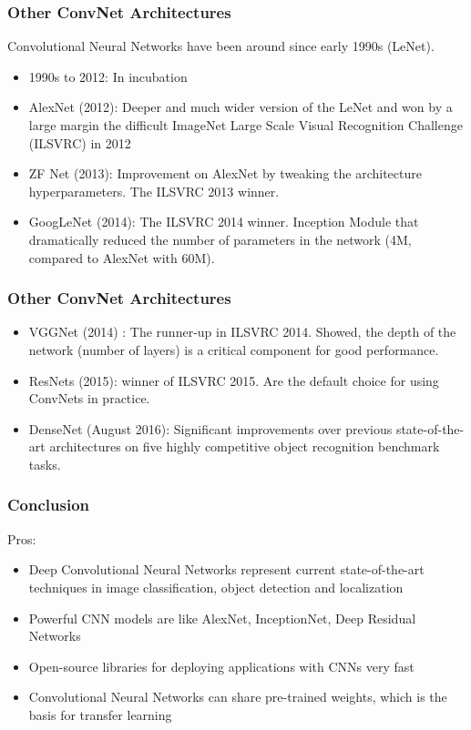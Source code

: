 \begin{frame}[fragile] \frametitle{Other ConvNet Architectures}
Convolutional Neural Networks have been around since early 1990s (LeNet).
\begin{itemize}
\item 1990s to 2012: In incubation
\item AlexNet (2012): Deeper and much wider version of the LeNet and won by a large margin the difficult ImageNet Large Scale Visual Recognition Challenge (ILSVRC) in 2012
\item ZF Net (2013): Improvement on AlexNet by tweaking the architecture hyperparameters. The ILSVRC 2013 winner.
\item GoogLeNet (2014): The ILSVRC 2014 winner. Inception Module that dramatically reduced the number of parameters in the network (4M, compared to AlexNet with 60M).
\end{itemize}
\end{frame}

\begin{frame}[fragile] \frametitle{Other ConvNet Architectures}
\begin{itemize}
\item VGGNet (2014) : The runner-up in ILSVRC 2014. Showed, the depth of the network (number of layers) is a critical component for good performance.
\item ResNets (2015): winner of ILSVRC 2015. Are the default choice for using ConvNets in practice.
\item DenseNet (August 2016): Significant improvements over previous state-of-the-art architectures on five highly competitive object recognition benchmark tasks.
\end{itemize}
\end{frame}

\begin{frame}[fragile] \frametitle{Conclusion}
Pros:
\begin{itemize}
\item  Deep Convolutional Neural Networks represent current state-of-the-art techniques in image 
classification, object detection and localization
\item  Powerful CNN models are like AlexNet, InceptionNet, Deep Residual Networks
\item  Open-source libraries for deploying applications with CNNs very fast
\item  Convolutional Neural Networks can share pre-trained weights, which is the basis for transfer learning 
\end{itemize}
\end{frame}

